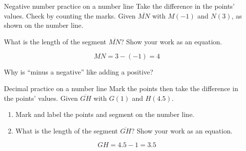 \begin{frame}{Negative number practice on a number line}
  {Take the difference in the points' values. Check by counting the marks.}
  Given $\overline{MN}$ with $M(-1)$ and $N(3)$, as shown on the number line.
    \begin{center}
    \end{center} \bigskip
    What is the length of the segment $\overline{MN}$? Show your work as an equation. \par \bigskip
     $$MN=3- (-1)=4$$ \par \bigskip
    Why is ``minus a negative'' like adding a positive?
  \end{frame}

\begin{frame}{Decimal practice on a number line}
  {Mark the points then take the difference in the points' values.} \vspace{1cm}
  Given $\overline{GH}$ with $G(1)$ and $H(4.5)$.
    \begin{enumerate}
      \item Mark and label the points and segment on the number line.
      \item What is the length of the segment $\overline{GH}$? Show your work as an equation.
    \end{enumerate}
    \begin{center}
    \end{center} \bigskip
     {$$GH= 4.5 - 1 = 3.5$$} \vspace{2cm}
  \end{frame}

